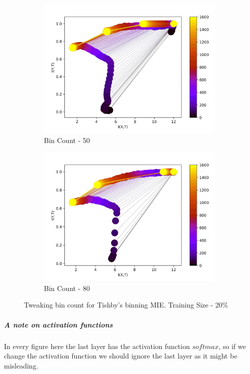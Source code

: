 \documentclass[dissertation.tex]{subfiles}
\begin{document}
\begin{figure}[ht]
\begin{subfigure}[t]{0.24\textwidth}
    \centering
    \includegraphics[width=\textwidth]{figs/eval/binCount/Binning50.jpg}
    \caption{
      Bin Count - 50
    }
    \label{figBinCount50}
  \end{subfigure}
  \hfill
  \begin{subfigure}[t]{0.24\textwidth}
    \centering
    \includegraphics[width=\textwidth]{figs/eval/binCount/Binning80.jpg}
    \caption{
      Bin Count - 80
    }
    \label{figBinCount80}
  \end{subfigure}
  \hfill
  \caption{
      Tweaking bin count for Tishby's binning MIE. Training Size - 20\%
    }
  \label{figBinCount}
\end{figure}


\subparagraph{A note on activation functions} In every figure here the last
layer has the activation function $softmax$, so if we change the activation
function we should ignore the last layer as it might be misleading.
\end{document}
